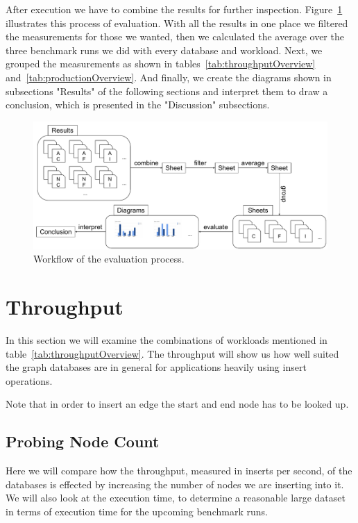 After execution we have to combine the results for further inspection.
Figure~\ref{fig:evaluationWorkflow} illustrates this process of evaluation.
With all the results in one place we filtered the measurements for those we wanted,
then we calculated the average over the three benchmark runs we did with every database and workload.
Next,
we grouped the measurements as shown in tables~\ref{tab:throughputOverview} and~\ref{tab:productionOverview}.
And finally,
we create the diagrams shown in subsections "Results" of the following sections and interpret them to draw a conclusion,
which is presented in the "Discussion" subsections.

\begin{figure}[!h]
  \includegraphics[width=\textwidth]{images/evaluationProcess}
  \caption{Workflow of the evaluation process.}
  \label{fig:evaluationWorkflow}
\end{figure}

\section{Throughput}
\label{ch:evaluation:se:throughput}
In this section we will examine the combinations of workloads mentioned in table~\ref{tab:throughputOverview}.
The throughput will show us how well suited the graph databases are in general for applications heavily using insert operations.

Note that in order to insert an edge the start and end node has to be looked up.

\subsection{Probing Node Count}
\label{ch:evaluation:se:probingNodeCount}
Here we will compare how the throughput,
measured in inserts per second,
of the databases is effected by increasing the number of nodes we are inserting into it.
We will also look at the execution time,
to determine a reasonable large dataset in terms of execution time for the upcoming benchmark runs.

